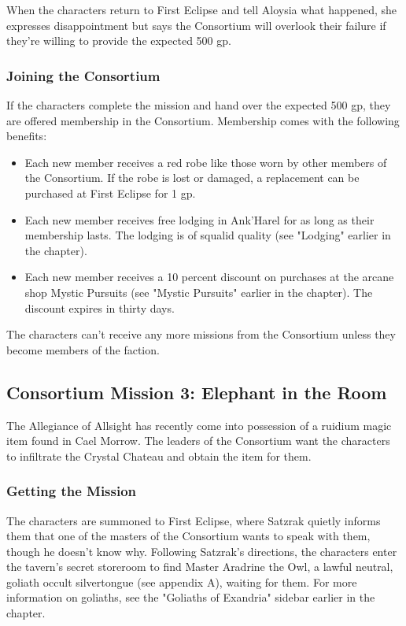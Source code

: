 \documentclass[10pt,a4paper,twoside,bg=print,twocolumn,openany,nodeprecatedcode]{dndbook}
\begin{document}
When the characters return to First Eclipse and tell Aloysia what happened, she expresses disappointment but says the Consortium will overlook their failure if they're willing to provide the expected 500 gp.

\subsubsection{Joining the Consortium}
If the characters complete the mission and hand over the expected 500 gp, they are offered membership in the Consortium. Membership comes with the following benefits:


\begin{itemize}
\item Each new member receives a red robe like those worn by other members of the Consortium. If the robe is lost or damaged, a replacement can be purchased at First Eclipse for 1 gp.
\item Each new member receives free lodging in Ank'Harel for as long as their membership lasts. The lodging is of squalid quality (see "Lodging" earlier in the chapter).
\item Each new member receives a 10 percent discount on purchases at the arcane shop Mystic Pursuits (see "Mystic Pursuits" earlier in the chapter). The discount expires in thirty days.
\end{itemize}

The characters can't receive any more missions from the Consortium unless they become members of the faction.

\subsection{Consortium Mission 3: Elephant in the Room}
The Allegiance of Allsight has recently come into possession of a ruidium magic item found in Cael Morrow. The leaders of the Consortium want the characters to infiltrate the Crystal Chateau and obtain the item for them.

\subsubsection{Getting the Mission}
The characters are summoned to First Eclipse, where Satzrak quietly informs them that one of the masters of the Consortium wants to speak with them, though he doesn't know why. Following Satzrak's directions, the characters enter the tavern's secret storeroom to find Master Aradrine the Owl, a lawful neutral, goliath occult silvertongue (see appendix A), waiting for them. For more information on goliaths, see the "Goliaths of Exandria" sidebar earlier in the chapter.
\end{document}
